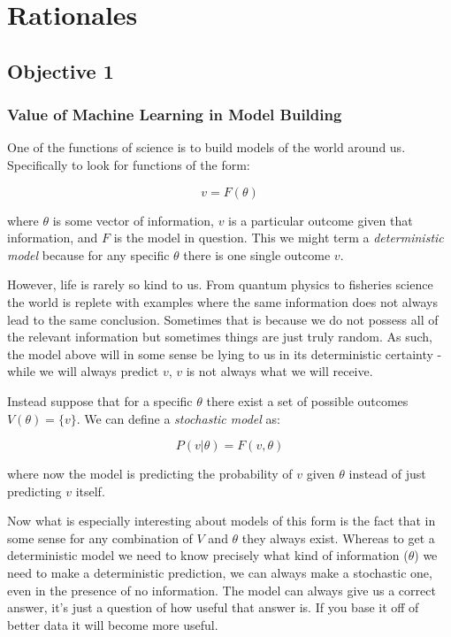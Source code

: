 \documentclass[11pt]{article}
\begin{document}
\newpage


















\section{Rationales}

\subsection{Objective 1}

\subsubsection{Value of Machine Learning in Model Building}

One of the functions of science is to build models of the world around us. Specifically to look for functions of the form:

$$v=F(\theta)$$

where $\theta$ is some vector of information, $v$ is a particular outcome given that information, and $F$ is the model in question. This we might term a \textit{deterministic model} because for any specific $\theta$ there is one single outcome $v$. 

However, life is rarely so kind to us. From quantum physics to fisheries science the world is replete with examples where the same information does not always lead to the same conclusion. Sometimes that is because we do not possess all of the relevant information but sometimes things are just truly random. As such, the model above will in some sense be lying to us in its deterministic certainty - while we will always predict $v$, $v$ is not always what we will receive. 

Instead suppose that for a specific $\theta$ there exist a set of possible outcomes $V(\theta)=\lbrace v \rbrace$. We can define a \textit{stochastic model} as:

$$P(v|\theta)=F(v, \theta)$$ 

where now the model is predicting the probability of $v$ given $\theta$ instead of just predicting $v$ itself.

Now what is especially interesting about models of this form is the fact that in some sense for any combination of $V$ and $\theta$ they always exist. Whereas to get a deterministic model we need to know precisely what kind of information ($\theta$) we need to make a deterministic prediction, we can always make a stochastic one, even in the presence of no information. The model can always give us a correct answer, it's just a question of how useful that answer is. If you base it off of better data it will become more useful.
\end{document}
